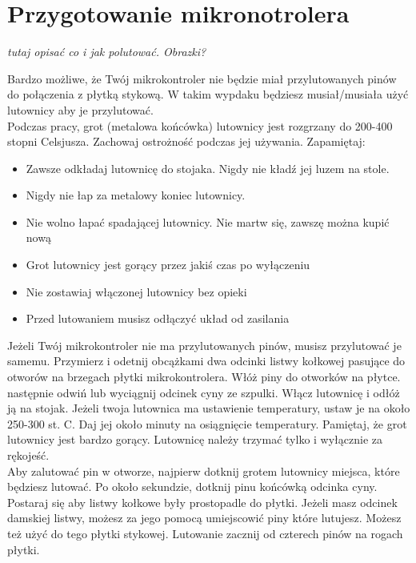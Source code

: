 \documentclass{pdfBooklets}
\begin{document}
\section{Przygotowanie mikronotrolera}
\textit{tutaj opisać co i jak polutować. Obrazki?}
\begin{ProTip}{}
  Bardzo możliwe, że Twój mikrokontroler nie będzie miał przylutowanych pinów do połączenia z płytką stykową.
  W takim wypdaku będziesz musiał/musiała użyć lutownicy aby je przylutować.\\
  Podczas pracy, grot (metalowa końcówka) lutownicy jest rozgrzany do 200-400 stopni Celsjusza. Zachowaj ostrożność
  podczas jej używania. Zapamiętaj:
  \begin{itemize}
  \item Zawsze odkładaj lutownicę do stojaka. Nigdy nie kładź jej luzem na stole.
  \item Nigdy nie łap za metalowy koniec lutownicy.
  \item Nie wolno łapać spadającej lutownicy. Nie martw się, zawszę można kupić nową
  \item Grot lutownicy jest gorący przez jakiś czas po wyłączeniu
  \item Nie zostawiaj włączonej lutownicy bez opieki
  \item Przed lutowaniem musisz odłączyć układ od zasilania
  \end{itemize}
\end{ProTip}

Jeżeli Twój mikrokontroler nie ma przylutowanych pinów, musisz przylutować je samemu. Przymierz i odetnij
obcążkami dwa odcinki listwy kołkowej pasujące do otworów na brzegach płytki mikrokontrolera. Włóż piny do otworków
na płytce. następnie odwiń lub wyciągnij odcinek cyny ze szpulki. Włącz lutownicę i odłóż ją na stojak. Jeżeli twoja lutownica
ma ustawienie temperatury, ustaw je na około 250-300 st. C. Daj jej około minuty na osiągnięcie temperatury. Pamiętaj, że grot
lutownicy jest bardzo gorący. Lutownicę należy trzymać tylko i wyłącznie za rękojeść.
\\

Aby zalutować pin w otworze, najpierw dotknij grotem lutownicy
miejsca, które będziesz lutować. Po około sekundzie, dotknij pinu końcówką odcinka cyny.
\\

Postaraj się aby listwy kołkowe były prostopadle do płytki. Jeżeli masz odcinek damskiej listwy, możesz za jego pomocą
umiejscowić piny które lutujesz. Możesz też użyć do tego płytki stykowej. Lutowanie zacznij od czterech pinów na rogach płytki.
\end{document}
